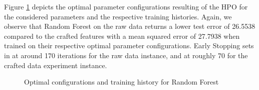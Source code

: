 Figure \ref{fig:RF_Optimal} depicts the optimal parameter configurations resulting of the HPO for the considered parameters and the respective training histories. Again, we observe that Random Forest on the raw data returns a lower test error of 26.5538 compared to the crafted features with a mean squared error of 27.7938 when trained on their respective optimal parameter configurations. Early Stopping sets in at around 170 iterations for the raw data instance, and at roughly 70 for the crafted data experiment instance. 
\begin{figure}[h]
	\centering
	\caption{Optimal configurations and training history for Random Forest}
	\label{fig:RF_Optimal}
\end{figure}

